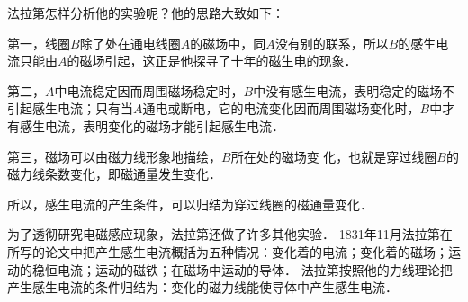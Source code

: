 法拉第怎样分析他的实验呢？他的思路大致如下：

第一，线圈$B$除了处在通电线圈$A$的磁场中，同$A$没有别的联系，所以$B$的感生电流只能由$A$的磁场引起，这正是他探寻了十年的磁生电的现象．

第二，$A$中电流稳定因而周围磁场稳定时，$B$中没有感生电流，表明稳定的磁场不引起感生电流；只有当$A$通电或断电，它的电流变化因而周围磁场变化时，$B$中才有感生电流，表明变化的磁场才能引起感生电流．

第三，磁场可以由磁力线形象地描绘，$B$所在处的磁场变
化，也就是穿过线圈$B$的磁力线条数变化，即磁通量发生变化．

所以，感生电流的产生条件，可以归结为穿过线圈的磁通量变化．

为了透彻研究电磁感应现象，法拉第还做了许多其他实验．
1831年11月法拉第在所写的论文中把产生感生电流概括为五种情况：变化着的电流；变化着的磁场；运动的稳恒电流；运动的磁铁；在磁场中运动的导体．
法拉第按照他的力线理论把产生感生电流的条件归结为：变化的磁力线能使导体中产生感生电流．

